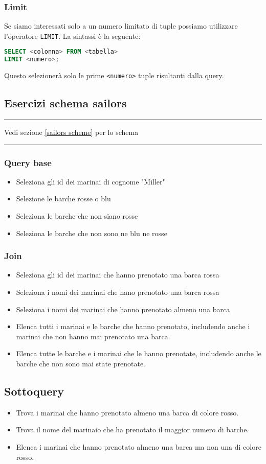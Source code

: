 \subsubsection*{Limit}
Se siamo interessati solo a un numero limitato di tuple possiamo utilizzare l'operatore \verb|LIMIT|. La sintassi è la seguente:
\begin{lstlisting}[language = SQL, style = SQL, frame = none] 
SELECT <colonna> FROM <tabella>
LIMIT <numero>; 
\end{lstlisting}
Questo selezionerà solo le prime \verb|<numero>| tuple risultanti dalla query.

\subsection{Esercizi schema sailors}
\hrule
\vskip3mm
Vedi sezione \ref{sailors scheme} per lo schema
\vskip3mm
\hrule
\vskip3mm
\subsubsection*{Query base}
\begin{itemize}
	\item Seleziona gli id dei marinai di cognome "Miller"
	\item Selezione le barche rosse o blu
	\item Seleziona le barche che non siano rosse
	\item Seleziona le barche che non sono ne blu ne rosse
\end{itemize}
\subsubsection*{Join}
\begin{itemize}
	\item Seleziona gli id dei marinai che hanno prenotato una barca rossa
	\item Seleziona i nomi dei marinai che hano prenotato una barca rossa
	\item Seleziona i nomi dei marinai che hanno prenotato almeno una barca
	\item Elenca tutti i marinai e le barche che hanno prenotato, includendo anche i marinai che non hanno mai prenotato una barca.
	\item Elenca tutte le barche e i marinai che le hanno prenotate, includendo anche le barche che non sono mai state prenotate.
\end{itemize}
\subsection*{Sottoquery}
\begin{itemize}
	\item Trova i marinai che hanno prenotato almeno una barca di colore rosso.
	\item Trova il nome del marinaio che ha prenotato il maggior numero di barche.
	\item Elenca i marinai che hanno prenotato almeno una barca ma non una di colore rosso.
\end{itemize}

